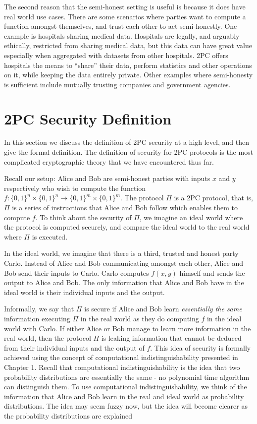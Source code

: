 The second reason that the semi-honest setting is useful is because it does have real world use cases.
There are some scenarios where parties want to compute a function amongst themselves, and trust each other to act semi-honestly.
One example is hospitals sharing medical data.
Hospitals are legally, and arguably ethically, restricted from sharing medical data, but this data can have great value especially when aggregated with datasets from other hospitals.
2PC offers hospitals the means to ``share'' their data, perform statistics and other operations on it, while keeping the data entirely private. 
Other examples where semi-honesty is sufficient include mutually trusting companies and government agencies.

\section{2PC Security Definition}
In this section we discuss the definition of 2PC security at a high level, and then give the formal definition. 
The definition of security for 2PC protocols is the most complicated cryptographic theory that we have encountered thus far. 

Recall our setup: Alice and Bob are semi-honest parties with inputs $x$ and $y$ respectively who wish to compute the function $f: \{0,1\}^n \times \{0,1\}^n \to \{0,1\}^m \times \{0,1\}^m$.
The protocol $\Pi$ is a 2PC protocol, that is, $\Pi$ is a series of instructions that Alice and Bob follow which enables them to compute $f$.
To think about the security of $\Pi$, we imagine an ideal world where the protocol is computed securely, and compare the ideal world to the real world where $\Pi$ is executed.

In the ideal world, we imagine that there is a third, trusted and honest party Carlo.
Instead of Alice and Bob communicating amongst each other, Alice and Bob send their inputs to Carlo.
Carlo computes $f(x,y)$ himself and sends the output to Alice and Bob.
The only information that Alice and Bob have in the ideal world is their individual inputs and the output.

Informally, we say that $\Pi$ is secure if Alice and Bob learn \textit{essentially the same} information executing $\Pi$ in the real world as they do computing $f$ in the ideal world with Carlo.
If either Alice or Bob manage to learn more information in the real world, then the protocol $\Pi$ is leaking information that cannot be deduced from their individual inputs and the output of $f$.
This idea of security is formally achieved using the concept of computational indistinguishability presented in Chapter 1. 
Recall that computational indistinguishability is the idea that two probability distributions are essentially the same - no polynomial time algorithm can distinguish them.
To use computational indistinguishability, we think of the information that Alice and Bob learn in the real and ideal world as probability distributions.
The idea may seem fuzzy now, but the idea will become clearer as the probability distributions are explained

